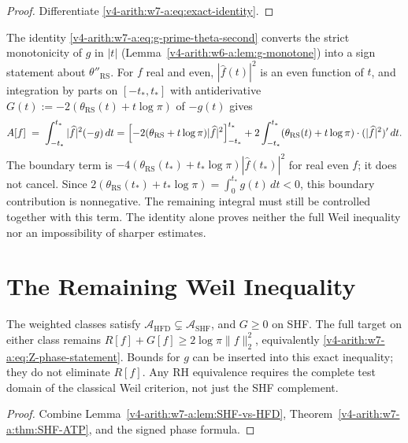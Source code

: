 \begin{proof}
Differentiate \eqref{v4-arith:w7-a:eq:exact-identity}.
\end{proof}

\begin{remark}
\label{v4-arith:w7-a:rem:theta-second-sign}
The identity \eqref{v4-arith:w7-a:eq:g-prime-theta-second} converts
the strict monotonicity of \(g\) in \(|t|\)
(Lemma~\ref{v4-arith:w6-a:lem:g-monotone}) into a sign statement about
\(\theta''_{\mathrm{RS}}\). For \(f\) real and even,
\(|\widehat{f}(t)|^{2}\) is an even function of \(t\), and integration
by parts on \([-t_{\ast},t_{\ast}]\) with antiderivative
\(G(t):=-2(\theta_{\mathrm{RS}}(t)+t\log\pi)\) of \(-g(t)\) gives
\begin{equation}
\label{v4-arith:w7-a:eq:integration-by-parts}
A[f]\;=\;\int_{-t_{\ast}}^{t_{\ast}}|\widehat{f}|^{2}(-g)\,dt
=\Bigl[-2(\theta_{\mathrm{RS}}+t\log\pi)|\widehat{f}|^{2}\Bigr]_{-t_{\ast}}^{t_{\ast}}
+2\int_{-t_{\ast}}^{t_{\ast}}(\theta_{\mathrm{RS}}(t)+t\log\pi)\cdot(|\widehat{f}|^{2})'\,dt.
\end{equation}
The boundary term is
\(-4(\theta_{\mathrm{RS}}(t_*)+t_*\log\pi)|\widehat f(t_*)|^2\)
for real even \(f\); it does not cancel. Since
\(2(\theta_{\mathrm{RS}}(t_*)+t_*\log\pi)=\int_0^{t_*}g(t)\,dt<0\),
this boundary contribution is nonnegative. The remaining integral
must still be controlled together with this term. The identity
alone proves neither the full Weil inequality nor an impossibility
of sharper estimates.
\end{remark}

\section{The Remaining Weil Inequality}
\label{v4-arith:w7-a:irreducible}
\begin{theorem}
\label{v4-arith:w7-a:thm:irreducible}
The weighted classes satisfy
\(\mathscr A_{\mathrm{HFD}}\subsetneq\mathscr A_{\mathrm{SHF}}\),
and \(G\ge0\) on SHF. The full target on either class remains
\(R[f]+G[f]\ge2\log\pi\|f\|_2^2\), equivalently
\eqref{v4-arith:w7-a:eq:Z-phase-statement}. Bounds for \(g\) can be
inserted into this exact inequality; they do not eliminate \(R[f]\).
Any RH equivalence requires the complete test domain of the
classical Weil criterion, not just the SHF complement.
\end{theorem}
\begin{proof}
Combine Lemma~\ref{v4-arith:w7-a:lem:SHF-vs-HFD},
Theorem~\ref{v4-arith:w7-a:thm:SHF-ATP}, and the signed phase formula.
\end{proof}

